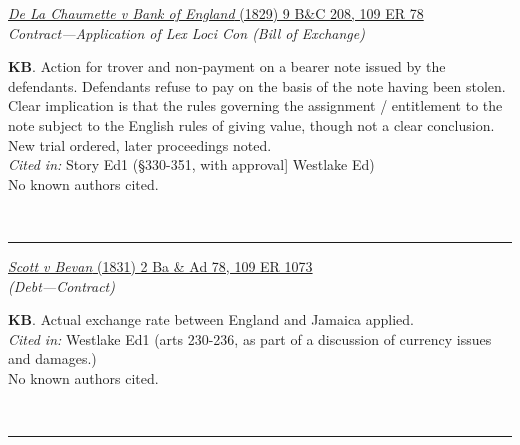\documentclass[twoside]{article}
\begin{document}
        \begin{small}
        \begin{center}
        \href{https://heinonline.org/HOL/P?h=hein.engrep/engrf0109&i=82}{\textit{De La Chaumette v Bank of England} (1829) 9 B\&C 208, 109 ER 78} \label{43} \\ 
\textit{Contract---Application of Lex Loci Con (Bill of Exchange)}\\
        \end{center}
        \textbf{KB}. Action for trover and non-payment on a bearer note issued by the defendants. Defendants refuse to pay on the basis of the note having been stolen. Clear implication is that the rules governing the assignment / entitlement to the note subject to the English rules of giving value, though not a clear conclusion. New trial ordered, later proceedings noted.\\\textit{Cited in: }Story Ed1 (§330-351, with approval] Westlake Ed)\\No known authors cited.
        \end{small}\\
        \rule{\textwidth}{0.5pt}
        

        \begin{small}
        \begin{center}
        \href{https://heinonline.org/HOL/P?h=hein.engrep/engrf0109&i=1077}{\textit{Scott v Bevan} (1831) 2 Ba \& Ad 78, 109 ER 1073} \label{36} \\ 
\textit{ (Debt---Contract)}\\
        \end{center}
        \textbf{KB}. Actual exchange rate between England and Jamaica applied.\\\textit{Cited in: }Westlake Ed1 (arts 230-236, as part of a discussion of currency issues and damages.)\\No known authors cited.
        \end{small}\\
        \rule{\textwidth}{0.5pt}
        
\end{document}
